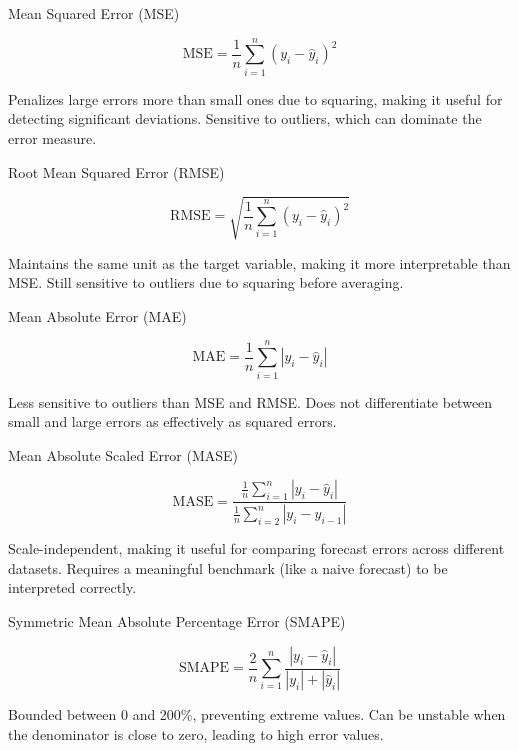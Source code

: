 Mean Squared Error (MSE)

\begin{equation}
    \text{MSE} = \frac{1}{n} \sum_{i=1}^{n} (y_i - \hat{y}_i)^2
\end{equation}

Penalizes large errors more than small ones due to squaring, making it useful for detecting significant deviations.
Sensitive to outliers, which can dominate the error measure.

Root Mean Squared Error (RMSE)

\begin{equation}
    \text{RMSE} = \sqrt{\frac{1}{n} \sum_{i=1}^{n} (y_i - \hat{y}_i)^2}
\end{equation}

Maintains the same unit as the target variable, making it more interpretable than MSE.
Still sensitive to outliers due to squaring before averaging.

Mean Absolute Error (MAE)

\begin{equation}
    \text{MAE} = \frac{1}{n} \sum_{i=1}^{n} |y_i - \hat{y}_i|
\end{equation}

Less sensitive to outliers than MSE and RMSE.
Does not differentiate between small and large errors as effectively as squared errors.

Mean Absolute Scaled Error (MASE)

\begin{equation}
    \text{MASE} = \frac{\frac{1}{n} \sum_{i=1}^{n} |y_i - \hat{y}_i|}{\frac{1}{n} \sum_{i=2}^{n} |y_i - y_{i-1}|}
\end{equation}

Scale-independent, making it useful for comparing forecast errors across different datasets.
Requires a meaningful benchmark (like a naive forecast) to be interpreted correctly.

Symmetric Mean Absolute Percentage Error (SMAPE)

\begin{equation}
    \text{SMAPE} = \frac{2}{n} \sum_{i=1}^{n} \frac{|y_i - \hat{y}_i|}{|y_i| + |\hat{y}_i|}
\end{equation}

Bounded between 0 and 200\%, preventing extreme values.
Can be unstable when the denominator is close to zero, leading to high error values.
